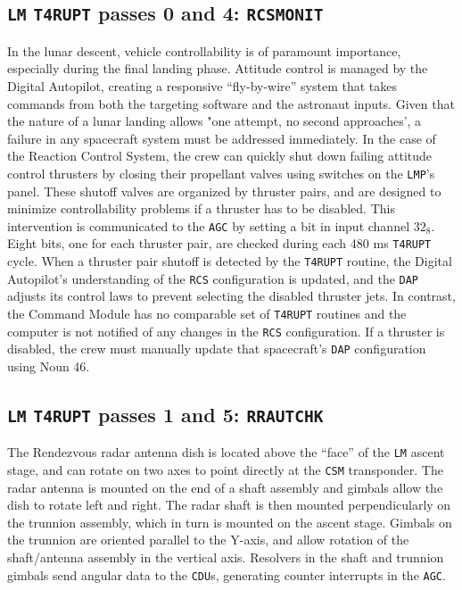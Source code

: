 \documentclass[refcap, oxford]{ahsan}
\begin{document}
\subsection{\texttt{LM} \texttt{T4RUPT} passes 0 and 4: \texttt{RCSMONIT}}
In the lunar descent, vehicle controllability is of paramount importance, especially during the final landing phase. Attitude control is managed by the Digital Autopilot, creating a responsive ``fly-by-wire'' system that takes commands from both the targeting software and the astronaut inputs. Given that the nature of a lunar landing allows "one attempt, no second approaches', a failure in any spacecraft system must be addressed immediately. In the case of the Reaction Control System, the crew can quickly shut down failing attitude control thrusters by closing their propellant valves using switches on the \texttt{LMP}'s panel. These shutoff valves are organized by thruster pairs, and are designed to minimize controllability problems if a thruster has to be disabled. This intervention is communicated to the \texttt{AGC} by setting a bit in input channel $32_{8}$. Eight bits, one for each thruster pair, are checked during each 480 ms \texttt{T4RUPT} cycle. When a thruster pair shutoff is detected by the \texttt{T4RUPT} routine, the Digital Autopilot's understanding of the \texttt{RCS} configuration is updated, and the \texttt{DAP} adjusts its control laws to prevent selecting the disabled thruster jets. In contrast, the Command Module has no comparable set of \texttt{T4RUPT} routines and the computer is not notified of any changes in the \texttt{RCS} configuration. If a thruster is disabled, the crew must manually update that spacecraft's \texttt{DAP} configuration using Noun 46.


\subsection{\texttt{LM} \texttt{T4RUPT} passes 1 and 5: \texttt{RRAUTCHK}}
The Rendezvous radar antenna dish is located above the ``face'' of the \texttt{LM} ascent stage, and can rotate on two axes to point directly at the \texttt{CSM} transponder. The radar antenna is mounted on the end of a shaft assembly and gimbals allow the dish to rotate left and right. The radar shaft is then mounted perpendicularly on the trunnion assembly, which in turn is mounted on the ascent stage. Gimbals on the trunnion are oriented parallel to the Y-axis, and allow rotation of the shaft/antenna assembly in the vertical axis. Resolvers in the shaft and trunnion gimbals send angular data to the \texttt{CDU}s, generating counter interrupts in the \texttt{AGC}.
\end{document}
